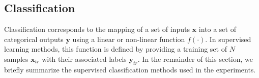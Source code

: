 
\subsection{Classification}\label{subsec:cls}

Classification corresponds to the mapping of a set of inputs $\mathbf{x}$ into a set of categorical outputs $\mathbf{y}$ using a linear or non-linear function $f(\cdot)$.
In supervised learning methods, this function is defined by providing a training set of $N$ samples $\mathbf{x}_{tr}$ with their associated labels $\mathbf{y}_{tr}$.
In the remainder of this section, we briefly summarize the supervised classification methods used in the experiments.


